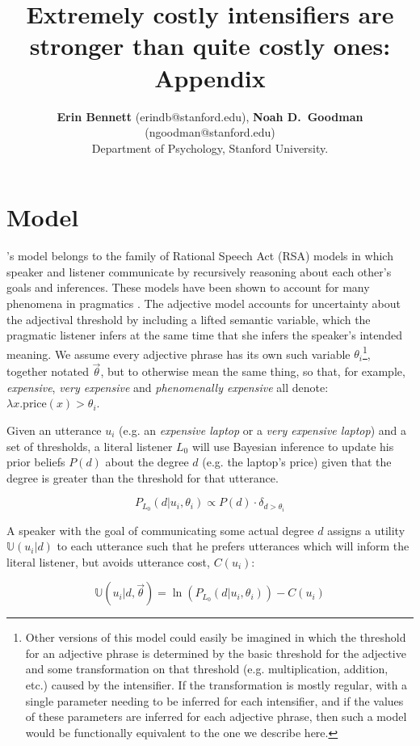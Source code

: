 \documentclass[10pt,letterpaper]{article}
\title{Extremely costly intensifiers are stronger than quite costly ones: Appendix}
\author{{\large \bf Erin Bennett} (erindb@stanford.edu), {\large \bf Noah D.~Goodman} (ngoodman@stanford.edu)\\
  Department of Psychology, Stanford University.}
\newcommand{\w}[1]{\emph{#1}}
\begin{document}
\maketitle
 
\section{Model} \label{app:model}

 's model belongs to the family of Rational Speech Act (RSA) models in which speaker and listener communicate by recursively reasoning about each other's goals and inferences. These models have been shown to account for many phenomena in pragmatics
\cite{frank, goodman}. The adjective model accounts for uncertainty about the adjectival threshold by including a lifted semantic variable, which the pragmatic listener infers at the same time that she infers the speaker's intended meaning. 
We assume every adjective phrase has its own such variable $\theta_i$\footnote{Other versions of this model could easily be imagined in which the threshold for an adjective phrase is determined by the basic threshold for the adjective and some transformation on that threshold (e.g. multiplication, addition, etc.) caused by the intensifier. If the transformation is mostly regular, with a single parameter needing to be inferred for each intensifier, and if the values of these parameters are inferred for each adjective phrase, then such a model would be functionally equivalent to the one we describe here.}, together notated $\vec{\theta}$, but to otherwise mean the same thing, so that, for example, \w{expensive}, \w{very expensive} and \w{phenomenally expensive} all denote: $\lambda x . \text{price}(x) > \theta_i$. %

Given an utterance $u_i$ (e.g. an \w{expensive laptop} or a \w{very expensive laptop}) and a set of thresholds, a literal listener $L_0$ will use Bayesian inference to update his prior beliefs $P(d)$ about the degree $d$ (e.g. the laptop's price) given that the degree is greater than the threshold for that utterance.

$$P_{L_0}(d|u_i, \theta_i) \propto P(d) \cdot \delta_{d > \theta_i}$$

A speaker with the goal of communicating some actual degree $d$ assigns a utility $\mathbb{U}(u_i|d)$ to each utterance such that he prefers utterances which will inform the literal listener, but avoids utterance cost, $C(u_i)$:

$$\mathbb{U}(u_i | d, \vec{\theta}) =  \ln\left(P_{L_0}(d | u_i, \theta_i) \right) - C(u_i) $$
\end{document}
